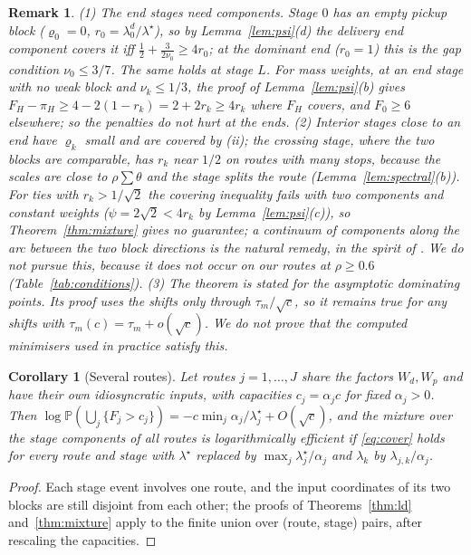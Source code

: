 \documentclass[pdflatex,sn-mathphys-ay]{sn-jnl}%
\theoremstyle{thmstyleone}%
\newtheorem{corollary}{Corollary}
\theoremstyle{thmstylethree}%
\theoremstyle{thmstyletwo}%
\newtheorem{remark}{Remark}
\renewcommand{\P}{\mathbb{P}}
\begin{document}
\begin{remark}
(1) The end stages need components. Stage $0$ has an empty pickup block ($\varrho_0=0$,
$r_0=\lambda^d_0/\lambda^\star$), so by Lemma~\ref{lem:psi}(d) the delivery end
component covers it iff $\frac12+\frac3{2\nu_0}\ge4r_0$; at the dominant end ($r_0=1$)
this is the gap condition $\nu_0\le3/7$. The same holds at stage $L$. For mass
weights, at an end stage with no weak block and $\nu_k\le1/3$, the proof of
Lemma~\ref{lem:psi}(b) gives $F_H-\pi_H\ge4-2(1-r_k)=2+2r_k\ge4r_k$ where $F_H$ covers,
and $F_0\ge6$ elsewhere; so the penalties do not hurt at the ends.
(2) Interior stages close to an end have $\varrho_k$ small and are covered by (ii); the
crossing stage, where the two blocks are comparable, has $r_k$ near $1/2$ on routes with
many stops, because the scales are close to $\rho\sum\theta$ and the stage splits the route
(Lemma~\ref{lem:spectral}(b)). For ties with $r_k>1/\sqrt2$ the covering inequality fails with two
components and constant weights ($\psi=2\sqrt2<4r_k$ by Lemma~\ref{lem:psi}(c)), so
Theorem~\ref{thm:mixture} gives no guarantee; a continuum of components along the arc
between the two block directions is the natural remedy, in the spirit of
\citet{DupuisWang2007}. We do not pursue this, because it does not occur on our routes at
$\rho\ge0.6$ (Table~\ref{tab:conditions}).
(3) The theorem is stated for the asymptotic dominating points. Its proof uses the shifts
only through $\tau_m/\sqrt c$, so it remains true for any shifts with
$\tau_m(c)=\tau_{m}+o(\sqrt c)$. We do not prove that the computed minimisers used in
practice satisfy this.
\end{remark}

\begin{corollary}[Several routes]\label{cor:plan}
Let routes $j=1,\dots,J$ share the factors $W_d,W_p$ and have their own idiosyncratic
inputs, with capacities $c_j=\alpha_jc$ for fixed $\alpha_j>0$. Then
$\log\P(\bigcup_j\{F_j>c_j\})=-c\min_j\alpha_j/\lambda^\star_j+O(\sqrt c)$, and the
mixture over the stage components of all routes is logarithmically efficient if
\eqref{eq:cover} holds for every route and stage with $\lambda^\star$ replaced by
$\max_j\lambda^\star_j/\alpha_j$ and $\lambda_k$ by $\lambda_{j,k}/\alpha_j$.
\end{corollary}

\begin{proof}
Each stage event involves one route, and the input coordinates of its two blocks are
still disjoint from each other; the proofs of Theorems~\ref{thm:ld} and~\ref{thm:mixture}
apply to the finite union over (route, stage) pairs, after rescaling the capacities.
\end{proof}
\end{document}
